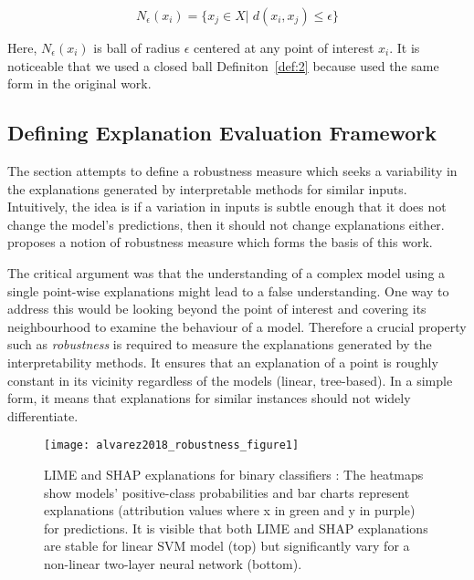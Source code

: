 \documentclass[english]{tktltiki2}
\theoremstyle{definition}
\theoremstyle{remark}
\newcommand{\onespace}{\;}
\begin{document}
\begin{equation}\label{eq:neighbourhood}
N_{\epsilon}(x_i) = \{x_j \in X| \onespace d(x_i, x_j) \leq \epsilon\}
\end{equation}  

Here, $N_{\epsilon}(x_{i})$ is ball of radius $\epsilon$ centered at any point of interest $x_i$. It is noticeable that we used a closed ball Definiton~\ref{def:2} because \citep{alvarez2018robustness} used the same form in the original work.

\subsection{Defining Explanation Evaluation Framework}\label{sec:defining_explanation_evaluation_framework} %
The section attempts to define a robustness measure which seeks a variability in the explanations generated by interpretable methods for similar inputs. Intuitively, the idea is if a variation in inputs is subtle enough that it does not change the model's predictions, then it should not change explanations either. \citet{alvarez2018robustness} proposes a notion of robustness measure which forms the basis of this work.

The critical argument was that the understanding of a complex model using a single point-wise explanations might lead to a false understanding. One way to address this would be looking beyond the point of interest and covering its neighbourhood to examine the behaviour of a model. Therefore a crucial property such as \textit{robustness} is required to measure the explanations generated by the interpretability methods. It ensures that an explanation of a point is roughly constant in its vicinity regardless of the models (linear, tree-based).  In a simple form, it means that explanations for similar instances should not widely differentiate.

\begin{wrapfigure}{r}{0.5\textwidth}
	\centering
	\vspace*{-2mm}
	\texttt{[image: alvarez2018\_robustness\_figure1]}
	\vspace*{-10mm}
	\caption{LIME and SHAP explanations for binary classifiers \citep{alvarez2018robustness}: The heatmaps show models’ positive-class probabilities and bar charts represent explanations (attribution values where x in green and y in purple) for predictions. It is visible that both LIME and SHAP explanations are stable for linear SVM model (top) but significantly vary for a non-linear two-layer neural network (bottom).}
	\label{fig:alvarez2018_robustness_figure1}
\end{wrapfigure}
\end{document}
